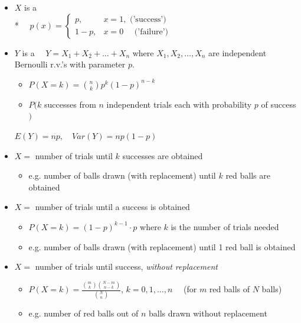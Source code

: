 \documentclass[10pt, landscape]{article}
\begin{document}
\begin{multicols*}{3}
  \begin{itemize}
    \item $X$ is a  
      \\* $\quad p(x) = \begin{cases}
        p, &x=1, \text{ ('success')} \\
        1-p, &x=0\quad  \text{ ('failure')}
      \end{cases}$
    \item $ Y $ is a  $ \quad Y = X_1 + X_2 + \dots + X_n $
      where  $ X_1, X_2, \dots, X_n $ are independent Bernoulli r.v.'s with parameter $ p $.
      \begin{itemize}
        \item $ P(X=k) = \binom{n}{k} p^k (1-p)^{n-k} $
        \item $ P(k $ successes from $ n $ independent trials each with probability $ p $ of success$ ) $
      \end{itemize}
      \centerline{$E(Y) = np, \quad Var(Y) = np(1-p)$}
    \item {} $ X = $ number of trials until $ k $ successes are obtained
      \begin{itemize}
        \item e.g. number of balls drawn (with replacement) until $ k $ red balls are obtained
      \end{itemize}
    \item {} $ X = $ number of trials until a success is obtained
      \begin{itemize}
        \item $ P(X=k) = (1-p)^{k-1} \cdot p $ where $ k $ is the number of trials needed
        \item e.g. number of balls drawn (with replacement) until 1 red ball is obtained
      \end{itemize}
    \item {} $ X = $ number of trials until success, \textit{without replacement}
      \begin{itemize}
        \item $P(X=k) = \frac{\binom{m}{k}\binom{N-m}{n-k}}{\binom{N}{n}}$, $k = 0,1,\dots, n \quad$ (for $m$ red balls of $N$ balls)
        \item e.g. number of red balls out of $ n $ balls drawn without replacement
      \end{itemize}
  \end{itemize}


\end{multicols*}
\end{document}
